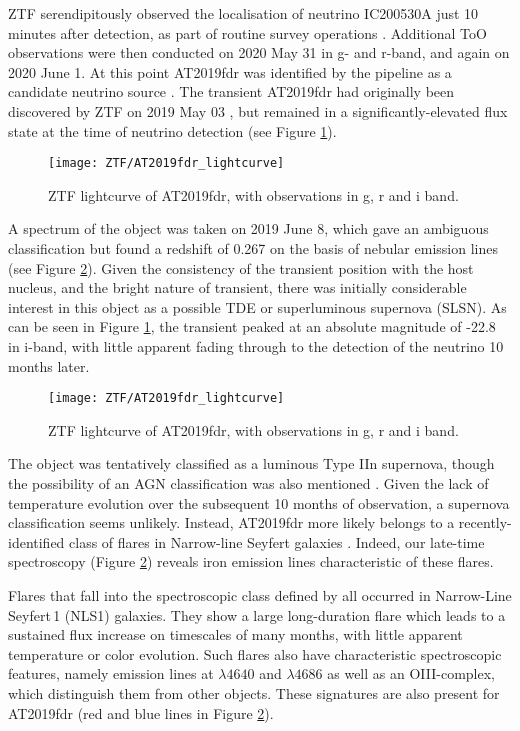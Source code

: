ZTF serendipitously observed the localisation of neutrino IC200530A just 10 minutes after detection, as part of routine survey operations . Additional ToO observations were then conducted on 2020 May 31 in g- and r-band, and again on 2020 June 1. At this point AT2019fdr was identified by the pipeline as a candidate neutrino source  . The transient AT2019fdr had originally been discovered by ZTF on 2019 May 03 \cite{at2019fdr_ampel_disc}, but remained in a significantly-elevated flux state at the time of neutrino detection (see Figure \ref{fig:at2019fdr_lightcurve}). 

\begin{figure}[!ht]
	\centering \texttt{[image: ZTF/AT2019fdr\_lightcurve]}
	\caption{ZTF lightcurve of AT2019fdr, with observations in g, r and i band. }
	\label{fig:at2019fdr_lightcurve}
\end{figure}

A spectrum of the object was taken on 2019 June 8, which gave an ambiguous classification but found a redshift of 0.267 on the basis of nebular emission lines (see Figure \ref{fig:at2019fdr_spectra}). Given the consistency of the transient position with the host nucleus, and the bright nature of transient, there was initially considerable interest in this object as a possible TDE or superluminous supernova (SLSN). As can be seen in Figure \ref{fig:at2019fdr_lightcurve}, the transient peaked at an absolute magnitude of -22.8 in i-band, with little apparent fading through to the detection of the neutrino 10 months later. 

\begin{figure}[!ht]
	\centering \texttt{[image: ZTF/AT2019fdr\_lightcurve]}
	\caption{ZTF lightcurve of AT2019fdr, with observations in g, r and i band. }
	\label{fig:at2019fdr_spectra}
\end{figure}

The object was tentatively classified as a luminous Type IIn supernova, though the possibility of an AGN classification was also mentioned \cite{at2019fdr_tns_class}. Given the lack of temperature evolution over the subsequent 10 months of observation, a supernova classification seems unlikely. Instead, AT2019fdr more likely belongs to a recently-identified class of flares in Narrow-line Seyfert galaxies . Indeed, our late-time spectroscopy (Figure \ref{fig:at2019fdr_spectra}) reveals iron emission lines  characteristic of these flares.

Flares that fall into the spectroscopic class defined by  all occurred in Narrow-Line Seyfert\,1 (NLS1) galaxies. They show a large long-duration flare which leads to a sustained flux increase on timescales of many months, with little apparent temperature or color evolution. Such flares also have characteristic spectroscopic features, namely emission lines at $\lambda4640$ and $\lambda4686$ as well as an OIII-complex, which distinguish them from other objects. These signatures are also present for AT2019fdr (red and blue lines in Figure \ref{fig:at2019fdr_spectra}).

